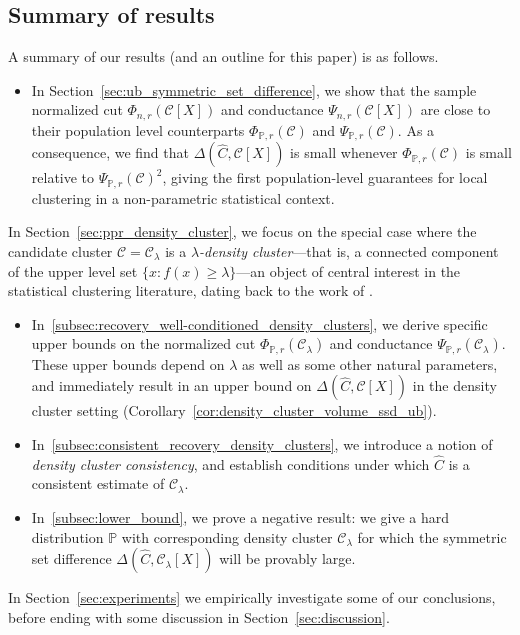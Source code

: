 \documentclass[11pt,twoside]{article}
\newcommand{\1}{\mathbf{1}}
\newcommand{\mc}[1]{\mathcal{#1}}
\newcommand{\Pbb}{\mathbb{P}}
\newcommand{\wh}[1]{\widehat{#1}}
\begin{document}
\subsection{Summary of results}
A summary of our results (and an outline for this paper) is as follows.
\begin{itemize}
	\item In Section~\ref{sec:ub_symmetric_set_difference}, we show that the sample normalized cut $\Phi_{n,r}(\mc{C}[X])$ and conductance $\Psi_{n,r}(\mc{C}[X])$ are close to their population level counterparts $\Phi_{\Pbb,r}(\mc{C})$ and $\Psi_{\Pbb,r}(\mc{C})$. As a consequence, we find that $\Delta(\wh{C},\mc{C}[X])$ is small whenever $\Phi_{\Pbb,r}(\mc{C})$ is small relative to $\Psi_{\Pbb,r}(\mc{C})^2$, giving the first population-level guarantees for local clustering in a non-parametric statistical context.
\end{itemize}
In Section~\ref{sec:ppr_density_cluster}, we focus on the special case where the candidate cluster $\mc{C} = \mc{C}_{\lambda}$ is a \emph{$\lambda$-density cluster}---that is, a connected component of the upper level set $\{x: f(x) \geq \lambda\}$---an object of central interest in the statistical clustering literature, dating back to the work of \citet{hartigan1981}.
\begin{itemize}
	\item In~\ref{subsec:recovery_well-conditioned_density_clusters}, we derive specific upper bounds on the normalized cut $\Phi_{\Pbb,r}(\mc{C}_{\lambda})$ and conductance $\Psi_{\Pbb,r}(\mc{C}_{\lambda})$. These upper bounds depend on $\lambda$ as well as some other natural parameters, and immediately result in an upper bound on $\Delta(\wh{C},\mc{C}[X])$ in the density cluster setting (Corollary~\ref{cor:density_cluster_volume_ssd_ub}).
	\item In~\ref{subsec:consistent_recovery_density_clusters}, we introduce a notion of \emph{density cluster consistency}, and establish conditions under which $\wh{C}$ is a consistent estimate of $\mc{C}_{\lambda}$.
	\item In~\ref{subsec:lower_bound}, we prove a negative result: we give a hard distribution $\Pbb$ with corresponding density cluster $\mc{C}_{\lambda}$ for which the symmetric set difference $\Delta(\wh{C},\mc{C}_{\lambda}[X])$ will be provably large.
\end{itemize}
In Section~\ref{sec:experiments} we empirically investigate some of our conclusions, before ending with some discussion in Section~\ref{sec:discussion}.
\end{document}
